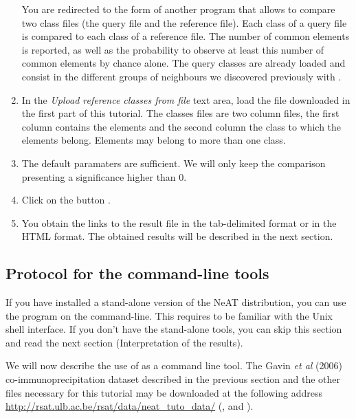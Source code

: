 \begin{enumerate}
You are redirected to the form of another program  that allows to compare two class
files (the query file and the reference file). Each class of a query file is compared to each class of a
reference file. The number of common elements is reported, as well as the probability to observe at least this
number of common elements by chance alone. The query classes are already loaded and consist in the different groups of neighbours we discovered previously with .

\item In the \textit{Upload reference classes from file} text area, load the file  downloaded in the first part of this tutorial. The classes files are two column files, the first column contains the elements and the second column the class to which the elements belong. Elements may belong to more than one class.

\item The default paramaters are sufficient. We will only keep the comparison presenting a significance higher than 0.

\item Click on the button .

\item You obtain the links to the result file in the tab-delimited format or in the HTML format. The obtained results will be described in the next section.


\end{enumerate}

\subsection{Protocol for the command-line tools}

If you have installed a stand-alone version of the NeAT distribution,
you can use the program  on the
command-line. This requires to be familiar with the Unix shell
interface. If you don't have the stand-alone tools, you can skip this
section and read the next section (Interpretation of the results).

We will now describe the use of  as a command line tool. 
The Gavin \textit{et al} (2006) \cite{Gavin2006} co-immunoprecipitation dataset described
in the previous section and the other files necessary for this tutorial 
may be downloaded at the following address \url{http://rsat.ulb.ac.be/rsat/data/neat\_tuto\_data/} (,  and ).


